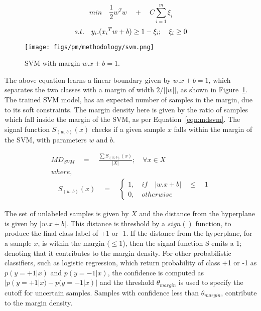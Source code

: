 \documentclass[authoryear,3p,times,twocolumn]{elsarticle}
\begin{document}
\begin{equation}
min\quad \frac { 1 }{ 2 } { w }^{ T }w\quad +\quad C\sum _{ i=1 }^{ m }{ { \xi  }_{ i } }  
\label{eqn:svm}
\end{equation}
\begin{equation}
s.t.\quad { y_i }.({ x_i }^{ T }w+b)\ge 1-{ \xi  }_{ i };\quad { { \xi  } }_{ i }\ge 0
\notag
\end{equation}

\begin{figure}[t]
  \centering
  \texttt{[image: figs/pm/methodology/svm.png]}
   \caption{SVM with margin $w.x \pm b=1$.}
  \label{fig:svm}
\end{figure}

The above equation learns a linear boundary given by $w.x \pm b=1$, which separates the two classes with a margin of width $2/||w||$, as shown in Figure~\ref{fig:svm}. The trained SVM model, has an expected number of samples in the margin, due to its soft constraints. The margin density here is given by the ratio of samples which fall inside the margin of the SVM, as per Equation~\ref{eqn:mdsvm}. The signal function $S_{(w,b)}(x)$ checks if a given sample $x$ falls within the margin of the SVM, with parameters $w$ and $b$.

\begin{equation}
\begin{aligned}
{ MD }_{ SVM }\quad =\quad \frac { \sum { { S }_{ (w,b) }(x) }  }{ \left| X \right|  } ;\quad \forall x\in X
\\
where, \\ 
\quad { S }_{ (w,b) }(x)\quad =\quad \begin{cases} 1,\quad if\quad \left| w.x+b \right| \quad \le \quad 1 \\ 0,\quad otherwise \end{cases}
\end{aligned}
\label{eqn:mdsvm}
\end{equation}

The set of unlabeled samples is given by $X$ and the distance from the hyperplane is given by $|w.x+b|$. This distance is threshold by a $sign()$ function, to produce the final class label of +1 or -1. If the distance from the hyperplane, for a sample $x$, is within the margin ($\leq 1$), then the signal function S emits a 1; denoting that it contributes to the margin density. For other probabilistic classifiers, such as logistic regression, which return probability of class +1 or -1 as $p(y=+1|x)$ and $p(y=-1|x)$, the confidence is computed as $|p(y=+1|x) - p(y=-1|x)|$ and the threshold $\theta_{margin}$ is used to specify the cutoff for uncertain samples. Samples with confidence less than $\theta_{margin}$, contribute to the margin density. 
\end{document}
